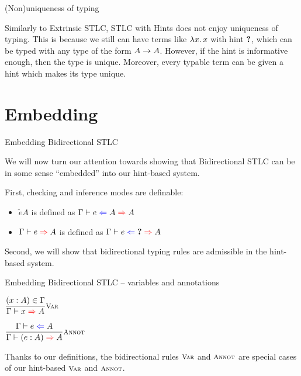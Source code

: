 \documentclass{beamer}
\begin{document}
\begin{frame}{(Non)uniqueness of typing}

Similarly to Extrinsic STLC, STLC with Hints does not enjoy uniqueness of typing. This is because we still can have terms like $\lambda x.\, x$ with hint $\textbf{?}$, which can be typed with any type of the form $A \to A$. However, if the hint is informative enough, then the type is unique. Moreover, every typable term can be given a hint which makes its type unique.

\end{frame}

\section{Embedding}

\begin{frame}{Embedding Bidirectional STLC}

We will now turn our attention towards showing that Bidirectional STLC can be in some sense ``embedded'' into our hint-based system.

\vspace{2em}

First, checking and inference modes are definable:

\begin{itemize}
  \item $\check{e}{A}$ is defined as $\hinting{e}{A}{A}$
  \item $\infer{e}{A}$ is defined as $\hinting{e}{\Hole}{A}$
\end{itemize}

\vspace{2em}

Second, we will show that bidirectional typing rules are admissible in the hint-based system.

\end{frame}

\begin{frame}{Embedding Bidirectional STLC -- variables and annotations}

\begin{center}
  $\infrule[Var]{\sidecond{(x : A) \in \Gamma}}{\infer{x}{A}}$

  \vspace{2em}

  $\infrule[Annot]{\check{e}{A}}{\infer{\annot{e}{A}}{A}}$
\end{center}

\vspace{2em}

Thanks to our definitions, the bidirectional rules $\textsc{\footnotesize{Var}}$ and $\textsc{\footnotesize{Annot}}$ are special cases of our hint-based $\textsc{\footnotesize{Var}}$ and $\textsc{\footnotesize{Annot}}$.

\end{frame}
\end{document}
